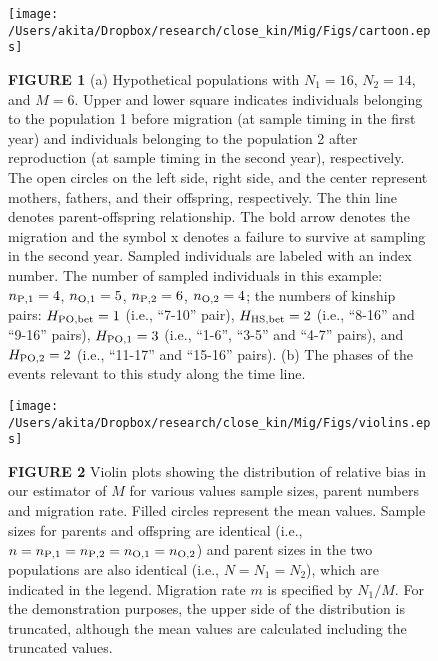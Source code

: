 \documentclass[12pt, English]{article}
\begin{document}
\begin{spacing}{1.9}
\clearpage

\newcommand{\figcapa}{(a) Hypothetical populations with $N_{1}=16$, $N_{2}=14$, and $M=6$. Upper and lower square indicates individuals belonging to the population 1 before migration (at sample timing in the first year) and individuals belonging to the population 2 after reproduction (at sample timing in the second year), respectively. The open circles on the left side, right side, and the center represent mothers, fathers, and their offspring, respectively. The thin line denotes parent-offspring relationship. The bold arrow denotes the migration and the symbol x denotes a failure to survive at sampling in the second year. Sampled individuals are labeled with an index number. The number of sampled individuals in this example: $n_{\rm P, 1}=4$, $n_{\rm O, 1}=5$, $n_{\rm P, 2}=6$, $n_{\rm O, 2}=4$; the numbers of kinship pairs: $H_{\rm PO, bet}=1$ (i.e., ``7-10'' pair), $H_{\rm HS, bet}=2$ (i.e., ``8-16'' and ``9-16'' pairs), $H_{\rm PO, 1}=3$ (i.e., ``1-6'', ``3-5'' and ``4-7'' pairs), and $H_{\rm PO, 2}=2$ (i.e., ``11-17'' and ``15-16'' pairs). (b) The phases of the events relevant to this study along the time line.}

\newcommand{\figcapb}{Violin plots showing the distribution of relative bias in our estimator of $M$ for various values sample sizes, parent numbers and migration rate. Filled circles represent the mean values. Sample sizes for parents and offspring are identical (i.e., $n=n_{\rm P,1}=n_{\rm P,2}=n_{\rm O,1}= n_{\rm O,2}$) and parent sizes in the two populations are also identical (i.e., $N=N_1=N_2$), which are indicated in the legend. Migration rate $m$ is specified by $N_1/M$. For the demonstration purposes, the upper side of the distribution is truncated, although the mean values are calculated including the truncated values. }

\begin{figure}[!h]
	\begin{center}
		\texttt{[image: /Users/akita/Dropbox/research/close\_kin/Mig/Figs/cartoon.eps]}
		\caption{{\bf FIGURE 1} \figcapa{}}
		\label{cartoon}
	\end{center}
\end{figure}

\begin{figure}[!h]
	\begin{center}
		\texttt{[image: /Users/akita/Dropbox/research/close\_kin/Mig/Figs/violins.eps]}
		\caption{{\bf FIGURE 2} \figcapb{}}
		\label{violins}
	\end{center}
\end{figure}




\end{spacing}
\end{document}
